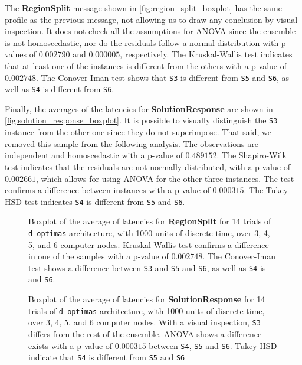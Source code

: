 \documentclass[preprint,12pt]{elsarticle}
\begin{document}
The \textbf{RegionSplit} message shown in \autoref{fig:region_split_boxplot} has the same profile as the previous message, not allowing us to draw any conclusion by visual inspection. It does not check all the assumptions for ANOVA since the ensemble is not homoscedastic, nor do the residuals follow a normal distribution with p-values of $0.002790$ and $0.000005$, respectively. The Kruskal-Wallis test indicates that at least one of the instances is different from the others with a p-value of $0.002748$. The Conover-Iman test shows that \texttt{S3} is different from \texttt{S5} and \texttt{S6}, as well as \texttt{S4} is different from \texttt{S6}. 

Finally, the averages of the latencies for \textbf{SolutionResponse} are shown in \autoref{fig:solution_response_boxplot}. It is possible to visually distinguish the \texttt{S3} instance from the other one since they do not superimpose. That said, we removed this sample from the following analysis. The observations are independent and homoscedastic with a p-value of $ 0.489152$. The Shapiro-Wilk test indicates that the residuals are not normally distributed, with a p-value of $0.002661$, which allows for using ANOVA for the other three instances. The test confirms a difference between instances with a p-value of $0.000315$.
The Tukey-HSD test indicates \texttt{S4} is different from \texttt{S5} and \texttt{S6}. 


\begin{figure}[ht!]
    \centering
    
    \caption{Boxplot of the average of latencies for \textbf{RegionSplit} for 14 trials of \texttt{d-optimas} architecture, with 1000 units of discrete time, over 3, 4, 5, and 6 computer nodes. Kruskal-Wallis test confirms a difference in one of the samples with a p-value of $0.002748$. The Conover-Iman test shows a difference between \texttt{S3} and \texttt{S5} and \texttt{S6}, as well as \texttt{S4} is and \texttt{S6}. }
    \label{fig:region_split_boxplot}
\end{figure}

\begin{figure}[ht!]
    \centering
    
    \caption{Boxplot of the average of latencies for \textbf{SolutionResponse} for 14 trials of \texttt{d-optimas} architecture, with 1000 units of discrete time, over 3, 4, 5, and 6 computer nodes. With a visual inspection, \texttt{S3} differs from the rest of the ensemble. ANOVA shows a difference exists with a p-value of $0.000315$ between \texttt{S4}, \texttt{S5} and \texttt{S6}. Tukey-HSD indicate that \texttt{S4} is different from \texttt{S5} and \texttt{S6}}
    \label{fig:solution_response_boxplot}
\end{figure}
\end{document}
